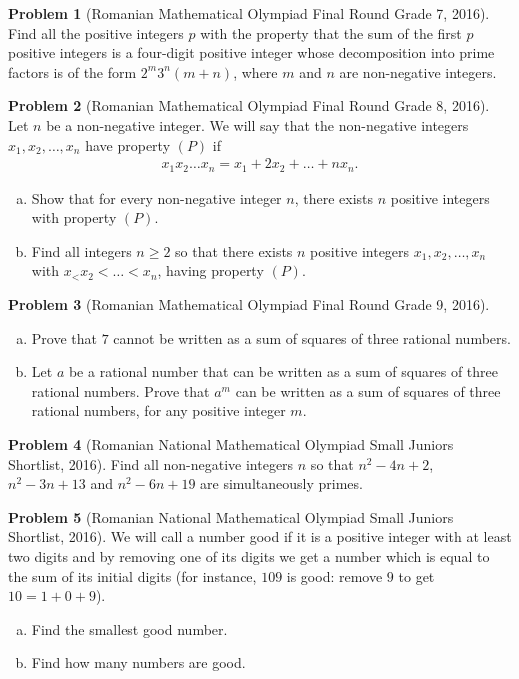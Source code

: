 \documentclass[]{article}
\theoremstyle{definition}
\newtheorem{problem}{Problem}
\begin{document}
\begin{problem}[Romanian Mathematical Olympiad Final Round Grade 7, 2016]
	Find all the positive integers $p$ with the property that the sum of the first $p$ positive integers is a four-digit positive integer whose decomposition into prime factors is of the form $2^m3^n(m + n)$, where $m$ and $n$ are non-negative integers.
\end{problem}



\begin{problem}[Romanian Mathematical Olympiad Final Round Grade 8, 2016]
	Let $n$ be a non-negative integer. We will say that the non-negative integers $x_1, x_2, \dots, x_n$ have property $(P)$ if
		\begin{align*}
			x_1x_2 \dots x_n = x_1 + 2x_2  + \dots + nx_n.
		\end{align*}
	\begin{enumerate}[(a)]
		\item  Show that for every non-negative integer $n$, there exists $n$ positive integers with property $(P)$.
		\item Find all integers $n \geq 2$ so that there exists $n$ positive integers $x_1, x_2, \dots, x_n$	with $x_< x_2< \dots< x_n$, having property $(P)$.
	\end{enumerate}
\end{problem}


\begin{problem}[Romanian Mathematical Olympiad Final Round Grade 9, 2016]
	$ $
		\begin{enumerate}[(a)]
			\item Prove that $7$ cannot be written as a sum of squares of three rational numbers.
			\item Let $a$ be a rational number that can be written as a sum of squares of three rational numbers. Prove that $a^m$ can be written as a sum of squares of three rational numbers, for any positive integer $m$.
		\end{enumerate}
\end{problem}




\begin{problem}[Romanian National Mathematical Olympiad Small Juniors Shortlist, 2016]
	Find all non-negative integers $n$ so that $n^2 - 4n + 2$, $n^2 - 3n + 13$ and $n^2 - 6n + 19$ are simultaneously primes.
\end{problem}


\begin{problem}[Romanian National Mathematical Olympiad Small Juniors Shortlist, 2016]
	We will call a number good if it is a positive integer with at least two digits and by removing one of its digits we get a number which is equal to the sum of its initial digits (for instance, $109$ is good: remove $9$ to get $10 = 1 + 0 + 9$).
		\begin{enumerate}[(a)]
			\item Find the smallest good number.
			\item Find how many numbers are good.
		\end{enumerate}
\end{problem}
\end{document}
